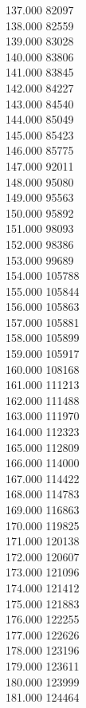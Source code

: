 { 137.000	82097 \\
 138.000	82559 \\
 139.000	83028 \\
 140.000	83806 \\
 141.000	83845 \\
 142.000	84227 \\
 143.000	84540 \\
 144.000	85049 \\
 145.000	85423 \\
 146.000	85775 \\
 147.000	92011 \\
 148.000	95080 \\
 149.000	95563 \\
 150.000	95892 \\
 151.000	98093 \\
 152.000	98386 \\
 153.000	99689 \\
 154.000	105788 \\
 155.000	105844 \\
 156.000	105863 \\
 157.000	105881 \\
 158.000	105899 \\
 159.000	105917 \\
 160.000	108168 \\
 161.000	111213 \\
 162.000	111488 \\
 163.000	111970 \\
 164.000	112323 \\
 165.000	112809 \\
 166.000	114000 \\
 167.000	114422 \\
 168.000	114783 \\
 169.000	116863 \\
 170.000	119825 \\
 171.000	120138 \\
 172.000	120607 \\
 173.000	121096 \\
 174.000	121412 \\
 175.000	121883 \\
 176.000	122255 \\
 177.000	122626 \\
 178.000	123196 \\
 179.000	123611 \\
 180.000	123999 \\
 181.000	124464 \\
}
